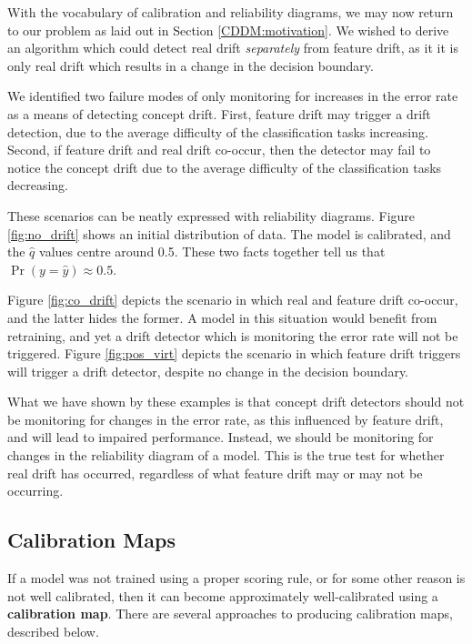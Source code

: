 With the vocabulary of calibration and reliability diagrams, we may now return to our problem as laid out in Section \ref{CDDM:motivation}. We wished to derive an algorithm which could detect real drift {\it separately} from feature drift, as it it is only real drift which results in a change in the decision boundary. 

We identified two failure modes of only monitoring for increases in the error rate as a means of detecting concept drift. First, feature drift may trigger a drift detection, due to the average difficulty of the classification tasks increasing. Second, if feature drift and real drift co-occur, then the detector may fail to notice the concept drift due to the average difficulty of the classification tasks decreasing. 

These scenarios can be neatly expressed with reliability diagrams. Figure \ref{fig:no_drift} shows an initial distribution of data. The model is calibrated, and the $\hat{q}$ values centre around 0.5. These two facts together tell us that $\Pr(y=\hat{y})\approx 0.5$. 

Figure \ref{fig:co_drift} depicts the scenario in which real and feature drift co-occur, and the latter hides the former. A model in this situation would benefit from retraining, and yet a drift detector which is monitoring the error rate will not be triggered. Figure \ref{fig:pos_virt} depicts the scenario in which feature drift triggers will trigger a drift detector, despite no change in the decision boundary.



What we have shown by these examples is that concept drift detectors should not be monitoring for changes in the error rate, as this influenced by feature drift, and will lead to impaired performance. Instead, we should be monitoring for changes in the reliability diagram of a model. This is the true test for whether real drift has occurred, regardless of what feature drift may or may not be occurring.


\subsection{Calibration Maps}

If a model was not trained using a proper scoring rule, or for some other reason is not well calibrated, then it can become approximately well-calibrated using a {\bf calibration map}. There are several approaches to producing calibration maps, described below.

